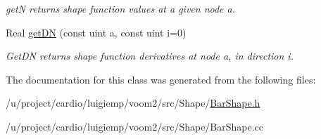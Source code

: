 \begin{DoxyCompactItemize}
\begin{DoxyCompactList}\small\item\em getN returns shape function values at a given node a. \item\end{DoxyCompactList}\item 
\hypertarget{classvoom_1_1_bar_shape_aa87f4b72df72d26ea0cb848543de1d53}{
Real \hyperlink{classvoom_1_1_bar_shape_aa87f4b72df72d26ea0cb848543de1d53}{getDN} (const uint a, const uint i=0)}
\label{classvoom_1_1_bar_shape_aa87f4b72df72d26ea0cb848543de1d53}

\begin{DoxyCompactList}\small\item\em GetDN returns shape function derivatives at node a, in direction i. \item\end{DoxyCompactList}\end{DoxyCompactItemize}


The documentation for this class was generated from the following files:\begin{DoxyCompactItemize}
\item 
/u/project/cardio/luigiemp/voom2/src/Shape/\hyperlink{_bar_shape_8h}{BarShape.h}\item 
/u/project/cardio/luigiemp/voom2/src/Shape/BarShape.cc\end{DoxyCompactItemize}
